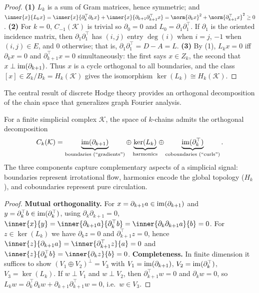 \begin{proof}
\textbf{(1)} $L_k$ is a sum of Gram matrices, hence symmetric; and
$\inner{x}{L_k x} = \inner{x}{\partial_k^\top \partial_k x}
+ \inner{x}{\partial_{k+1}\partial_{k+1}^\top x}
= \norm{\partial_k x}^2 + \norm{\partial_{k+1}^\top x}^2 \ge 0$.
\textbf{(2)} For $k = 0$, $C_{-1}(\mathcal{K})$ is trivial so $\partial_0 = 0$
and $L_0 = \partial_1 \partial_1^\top$. If $\partial_1$ is the oriented incidence
matrix, then $\partial_1 \partial_1^\top$ has $(i,j)$ entry $\deg(i)$ when
$i = j$, $-1$ when $(i,j) \in E$, and $0$ otherwise; that is,
$\partial_1 \partial_1^\top = D - A = L$. \textbf{(3)} By (1), $L_k x = 0$ iff
$\partial_k x = 0$ and $\partial_{k+1}^\top x = 0$ simultaneously: the first says
$x \in Z_k$, the second that $x \perp \operatorname{im}(\partial_{k+1})$. Thus $x$ is a cycle
orthogonal to all boundaries, and the class $[x] \in Z_k / B_k = H_k(\mathcal{K})$
gives the isomorphism $\ker(L_k) \cong H_k(\mathcal{K})$.
\end{proof}

The central result of discrete Hodge theory provides an orthogonal decomposition
of the chain space that generalizes graph Fourier analysis.

\begin{theorem}
\label{thm:graphs:hodge-decomp}
For a finite simplicial complex $\mathcal{K}$, the space of $k$-chains admits the
orthogonal decomposition
\[
  C_k(\mathcal{K})
    = \underbrace{\operatorname{im}(\partial_{k+1})}_{\text{boundaries (``gradients'')}}
    \oplus \underbrace{\ker(L_k)}_{\text{harmonics}}
    \oplus \underbrace{\operatorname{im}(\partial_k^\top)}_{\text{coboundaries (``curls'')}} .
\]
The three components capture complementary aspects of a simplicial signal:
boundaries represent irrotational flow, harmonics encode the global topology
($H_k$), and coboundaries represent pure circulation.
\end{theorem}

\begin{proof}
\textbf{Mutual orthogonality.} For $x = \partial_{k+1} a \in \operatorname{im}(\partial_{k+1})$
and $y = \partial_k^\top b \in \operatorname{im}(\partial_k^\top)$, using
$\partial_k \partial_{k+1} = 0$,
$\inner{x}{y} = \inner{\partial_{k+1} a}{\partial_k^\top b}
= \inner{\partial_k \partial_{k+1} a}{b} = 0$. For $z \in \ker(L_k)$ we have
$\partial_k z = 0$ and $\partial_{k+1}^\top z = 0$, hence
$\inner{z}{\partial_{k+1} a} = \inner{\partial_{k+1}^\top z}{a} = 0$ and
$\inner{z}{\partial_k^\top b} = \inner{\partial_k z}{b} = 0$.
\textbf{Completeness.} In finite dimension it suffices to show
$(V_1 \oplus V_2)^\perp = V_3$ with $V_1 = \operatorname{im}(\partial_{k+1})$,
$V_2 = \operatorname{im}(\partial_k^\top)$, $V_3 = \ker(L_k)$. If
$w \perp V_1$ and $w \perp V_2$, then $\partial_{k+1}^\top w = 0$ and
$\partial_k w = 0$, so
$L_k w = \partial_k^\top \partial_k w + \partial_{k+1}\partial_{k+1}^\top w = 0$,
i.e.\ $w \in V_3$.
\end{proof}

